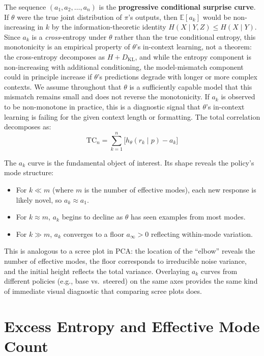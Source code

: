 \documentclass[11pt]{article}
\newcommand{\E}{\mathbb{E}}
\newcommand{\KL}{D_{\mathrm{KL}}}
\newcommand{\TC}{\mathrm{TC}}
\begin{document}
The sequence $(a_1, a_2, \ldots, a_n)$ is the \textbf{progressive conditional surprise curve}. If $\theta$ were the true joint distribution of $\pi$'s outputs, then $\E[a_k]$ would be non-increasing in $k$ by the information-theoretic identity $H(X \mid Y, Z) \leq H(X \mid Y)$. Since $a_k$ is a \emph{cross}-entropy under $\theta$ rather than the true conditional entropy, this monotonicity is an empirical property of $\theta$'s in-context learning, not a theorem: the cross-entropy decomposes as $H + \KL$, and while the entropy component is non-increasing with additional conditioning, the model-mismatch component could in principle increase if $\theta$'s predictions degrade with longer or more complex contexts. We assume throughout that $\theta$ is a sufficiently capable model that this mismatch remains small and does not reverse the monotonicity. If $a_k$ is observed to be non-monotone in practice, this is a diagnostic signal that $\theta$'s in-context learning is failing for the given context length or formatting. The total correlation decomposes as:
\begin{equation}
    \TC_n = \sum_{k=1}^{n}\bigl[h_\theta(r_k \mid p) - a_k\bigr]
\end{equation}

The $a_k$ curve is the fundamental object of interest. Its shape reveals the policy's mode structure:
\begin{itemize}[nosep]
    \item For $k \ll m$ (where $m$ is the number of effective modes), each new response is likely novel, so $a_k \approx a_1$.
    \item For $k \approx m$, $a_k$ begins to decline as $\theta$ has seen examples from most modes.
    \item For $k \gg m$, $a_k$ converges to a floor $a_\infty > 0$ reflecting within-mode variation.
\end{itemize}

This is analogous to a scree plot in PCA: the location of the ``elbow'' reveals the number of effective modes, the floor corresponds to irreducible noise variance, and the initial height reflects the total variance. Overlaying $a_k$ curves from different policies (e.g., base vs.\ steered) on the same axes provides the same kind of immediate visual diagnostic that comparing scree plots does.

\section{Excess Entropy and Effective Mode Count}
\end{document}
